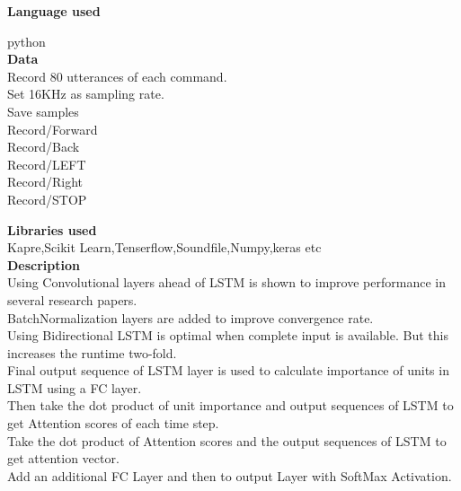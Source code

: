 \documentclass[a4paper,12pt]{article}
\begin{document}
\textbf{Language used}

python\\ 

\textbf{Data}\\

Record 80 utterances of each command.\\

Set 16KHz as sampling rate.\\

Save samples\\

Record/Forward\\

Record/Back\\

Record/LEFT\\

Record/Right\\

Record/STOP\\
\pagebreak

\textbf{Libraries used}\\

Kapre,Scikit Learn,Tenserflow,Soundfile,Numpy,keras etc\\

\textbf{Description}\\

Using Convolutional layers ahead of LSTM is shown to improve performance in several research papers.\\

BatchNormalization layers are added to improve convergence rate.\\

Using Bidirectional LSTM is optimal when complete input is available. But this increases the runtime two-fold.\\

Final output sequence of LSTM layer is used to calculate importance of units in LSTM using a FC layer.\\

Then take the dot product of unit importance and output sequences of LSTM to get Attention scores of each time step.\\

Take the dot product of Attention scores and the output sequences of LSTM to get attention vector.\\

Add an additional FC Layer and then to output Layer with SoftMax Activation.\\
\end{document}
